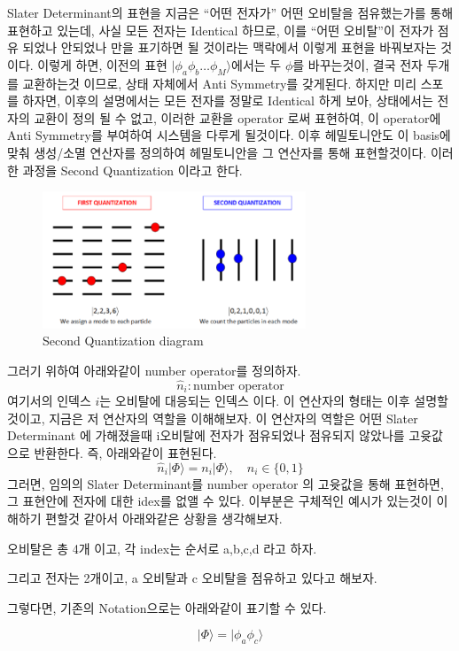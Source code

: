 \documentclass[11pt]{article}
\begin{document}
Slater Determinant의 표현을 지금은 \enquote{어떤 전자가} 어떤 오비탈을 점유했는가를 통해 표현하고 있는데, 
사실 모든 전자는 Identical 하므로, 이를 \enquote{어떤 오비탈}이 전자가 점유 되었나 안되었나 만을 표기하면 될 것이라는 맥락에서 이렇게 표현을 바꿔보자는 것이다. 
이렇게 하면, 이전의 표현 \(\vert \phi_a \phi_b \dots \phi_M\rangle\)에서는 두 \(\phi\)를 바꾸는것이, 결국 전자 두개를 교환하는것 이므로, 상태 자체에서 Anti Symmetry를 갖게된다. 
하지만 미리 스포를 하자면, 이후의 설명에서는 모든 전자를 정말로 Identical 하게 보아, 상태에서는 전자의 교환이 정의 될 수 없고, 이러한 교환을 operator 로써 표현하여, 이 operator에 Anti Symmetry를 부여하여 시스템을 다루게 될것이다. 
이후 헤밀토니안도 이 basis에 맞춰 생성/소멸 연산자를 정의하여 헤밀토니안을 그 연산자를 통해 표현할것이다. 
이러한 과정을 Second Quantization 이라고 한다. 
\begin{figure}[H]
  \centering
  \includegraphics[width=0.7\textwidth]{fig/1to2.png}
  \caption{Second Quantization diagram}
  \label{fig:example2}
\end{figure}
그러기 위하여 아래와같이 number operator를 정의하자.
\[
\hat{n}_i : \text{number operator}
\]
여기서의 인덱스 \(i\)는 오비탈에 대응되는 인덱스 이다. 이 연산자의 형태는 이후 설명할것이고, 지금은 저 연산자의 역할을 이해해보자. 
이 연산자의 역할은 어떤 Slater Determinant 에 가해졌을때 i오비탈에 전자가 점유되었나 점유되지 않았나를 고윳값으로 반환한다. 즉, 아래와같이 표현된다. 
\[
\hat{n}_i | \Phi \rangle = n_i | \Phi \rangle, \quad n_i \in \{0,1\}
\]
그러면, 임의의 Slater Determinant를 number operator 의 고윳값을 통해 표현하면, 그 표현안에 전자에 대한 idex를 없앨 수 있다.
이부분은 구체적인 예시가 있는것이 이해하기 편할것 같아서 아래와같은 상황을 생각해보자. 

오비탈은 총 4개 이고, 각 index는 순서로 a,b,c,d 라고 하자. 

그리고 전자는 2개이고, a 오비탈과 c 오비탈을 점유하고 있다고 해보자. 

그렇다면, 기존의 Notation으로는 아래와같이 표기할 수 있다. 

\[| \Phi \rangle  = \vert \phi_a \phi_c \rangle\]
\end{document}
